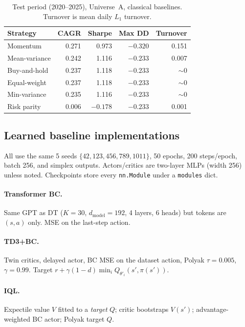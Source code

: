 \documentclass[11pt]{article}
\begin{document}
\begin{table}[h]
\centering
\caption{Test period (2020--2025), Universe~A, classical baselines. Turnover is mean daily $L_1$ turnover.}
\label{tab:test}
\begin{tabular}{lrrrr}
\toprule
Strategy & CAGR & Sharpe & Max DD & Turnover \\
\midrule
Momentum       & 0.271 & 0.973 & $-0.320$ & 0.151 \\
Mean-variance  & 0.242 & 1.116 & $-0.233$ & 0.007 \\
Buy-and-hold   & 0.237 & 1.118 & $-0.233$ & $\sim 0$ \\
Equal-weight   & 0.237 & 1.118 & $-0.233$ & $\sim 0$ \\
Min-variance   & 0.235 & 1.116 & $-0.233$ & $\sim 0$ \\
Risk parity    & 0.006 & $-0.178$ & $-0.233$ & 0.001 \\
\bottomrule
\end{tabular}
\end{table}

\subsection{Learned baseline implementations}
All use the same 5 seeds $\{42,123,456,789,1011\}$, 50 epochs, 200 steps/epoch, batch 256, and simplex outputs. Actors/critics are two-layer MLPs (width 256) unless noted. Checkpoints store every \texttt{nn.Module} under a \texttt{modules} dict.

\paragraph{Transformer BC.}
Same GPT as DT ($K=30$, $d_{\mathrm{model}}=192$, 4 layers, 6 heads) but tokens are $(s,a)$ only. MSE on the last-step action.

\paragraph{TD3+BC.}
Twin critics, delayed actor, BC MSE on the dataset action, Polyak $\tau=0.005$, $\gamma=0.99$. Target $r+\gamma(1-d)\min_i Q_{\theta'_i}(s', \pi(s'))$.

\paragraph{IQL.}
Expectile value $V$ fitted to a \emph{target} $Q$; critic bootstraps $V(s')$; advantage-weighted BC actor; Polyak target $Q$.
\end{document}
